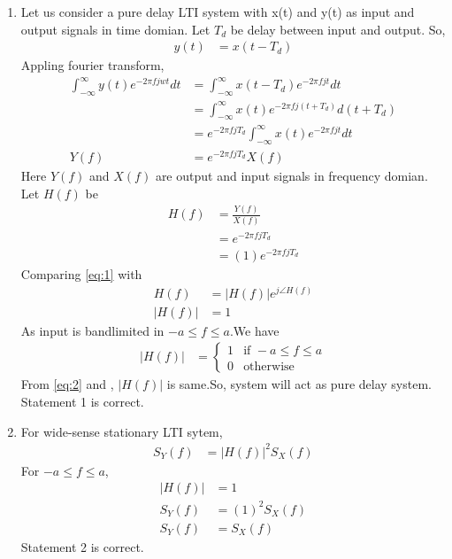 \documentclass[journal,12pt,twocolumn]{IEEEtran}
\theoremstyle{remark}
\begin{document}
\begin{enumerate}
\item Let us consider a pure delay LTI system with x(t) and y(t) as input and output signals in time domian. Let $T_d$ be delay between input and output. So,
\begin{align}
y(t)&=x(t-T_d)
\end{align}
Appling fourier transform,
\begin{align}
\int_{-\infty}^{\infty}y(t)e^{-2\pi fjwt}dt&=\int_{-\infty}^{\infty}x(t-T_d)e^{-2\pi fjt}dt\\
&=\int_{-\infty}^{\infty}x(t)e^{-2\pi fj(t+T_d)}d(t+T_d)\\
&=e^{-2\pi fjT_d}\int_{-\infty}^{\infty}x(t)e^{-2\pi fjt}dt\\
Y(f)&=e^{-2\pi fjT_d}X(f)
\end{align}
Here $Y(f)$ and $X(f)$ are output and input signals in frequency domian. Let $H(f)$ be 
\begin{align}
H(f)&=\frac{Y(f)}{X(f)}\\
&=e^{-2\pi fjT_d}\\
&=(1)e^{-2\pi fjT_d}
\label{eq:1}
\end{align}
Comparing \eqref{eq:1} with
\begin{align}
H(f)&=|H(f)|e^{j\angle H(f)}\\
|H(f)|&=1
\end{align}
As input is bandlimited in $-a\leq f \leq a$.We have
\begin{align}
|H(f)| &= 
        \begin{cases}
            1 & \text{if }-a \leq f \leq a\\
            0 & \text{otherwise}
        \end{cases}\label{eq:2}
\end{align}
From \eqref{eq:2} and , $|H(f)|$ is same.So, system will act as pure delay system. Statement 1 is correct.
\item For wide-sense stationary LTI sytem,
\begin{align}
S_Y(f)&=|H(f)|^2S_X(f)
\end{align}
For $-a \leq f \leq a$,
\begin{align}
|H(f)|&=1\\
S_Y(f)&=(1)^2S_X(f)\\
S_Y(f)&=S_X(f)
\end{align}
Statement 2 is correct.
\end{enumerate}
\end{document}
